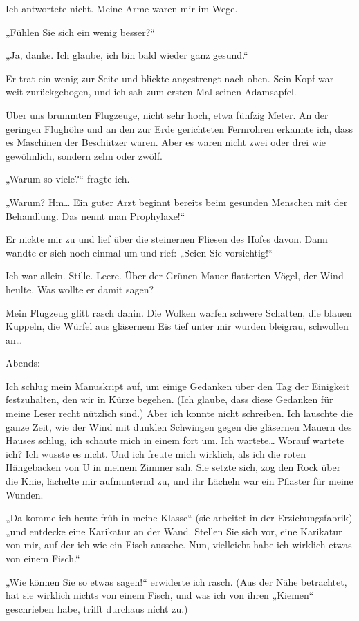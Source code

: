 Ich antwortete nicht. Meine Arme waren mir im Wege.

„Fühlen Sie sich ein wenig besser?“

„Ja, danke. Ich glaube, ich bin bald wieder ganz gesund.“

Er trat ein wenig zur Seite und blickte angestrengt nach oben. Sein
Kopf war weit zurückgebogen, und ich sah zum ersten Mal seinen
Adamsapfel.

Über uns brummten Flugzeuge, nicht sehr hoch, etwa
fünfzig Meter. An der geringen Flughöhe und an den zur Erde
gerichteten Fernrohren erkannte ich, dass es Maschinen der
Beschützer waren. Aber es waren nicht zwei oder drei wie
gewöhnlich, sondern zehn oder zwölf.

„Warum so viele?“ fragte ich.

„Warum? Hm\ldots{} Ein guter Arzt beginnt bereits beim gesunden Menschen
mit der Behandlung. Das nennt
man Prophylaxe!“

Er nickte mir zu und lief über die steinernen Fliesen des Hofes
davon. Dann wandte er sich noch einmal um
und rief: „Seien Sie vorsichtig!“

Ich war allein. Stille. Leere. Über der Grünen Mauer flatterten
Vögel, der Wind heulte. Was wollte er damit sagen?

Mein Flugzeug glitt rasch dahin. Die Wolken warfen schwere
Schatten, die blauen Kuppeln, die Würfel aus
gläsernem Eis tief unter mir wurden bleigrau, schwollen an\ldots{}

\bigpar
Abends:

Ich schlug mein Manuskript auf, um einige Gedanken über den Tag der
Einigkeit festzuhalten, den wir in Kürze begehen. (Ich glaube, dass
diese Gedanken für meine Leser recht nützlich sind.) Aber ich
konnte nicht schreiben. Ich lauschte die ganze Zeit, wie der Wind
mit dunklen Schwingen gegen die gläsernen Mauern des Hauses schlug,
ich schaute mich in einem fort um. Ich wartete\ldots{} Worauf wartete
ich? Ich wusste es nicht. Und ich freute mich wirklich, als ich die
roten Hängebacken von U in meinem Zimmer sah. Sie setzte sich, zog
den Rock über die Knie, lächelte mir aufmunternd zu, und ihr
Lächeln war ein Pflaster für meine Wunden.

„Da komme ich heute früh
in meine Klasse“ (sie arbeitet
in der Erziehungsfabrik) „und entdecke eine Karikatur an der Wand.
Stellen Sie sich vor, eine Karikatur von mir, auf der ich wie ein
Fisch aussehe. Nun, vielleicht habe ich wirklich etwas von einem
Fisch.“

„Wie können Sie so etwas sagen!“ erwiderte ich rasch. (Aus
der Nähe betrachtet, hat sie wirklich nichts von einem Fisch, und
was ich von ihren „Kiemen“ geschrieben habe, trifft durchaus nicht
zu.)

